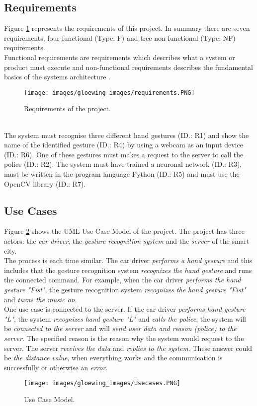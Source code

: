 \subsection{Requirements}
\label{subsec:requirements}
Figure \ref{fig:requirements} represents the requirements of this project. In summary there are seven requirements, four functional (Type: F) and tree non-functional (Type: NF) requirements.\\
Functional requirements are requirements which describes what a system or product must execute \cite{robertson2012mastering} and non-functional requirements describes the fundamental basics of the systems architecture \cite{6365165}.
\begin{figure}
\sidecaption
\texttt{[image: images/gloewing\_images/requirements.PNG]}
\caption{Requirements of the project.}
\label{fig:requirements}
\end{figure}\\
The system must recognise three different hand gestures (ID.: R1) and show the name of the identified gesture (ID.: R4) by using a webcam as an input device (ID.: R6). One of these gestures must makes a request to the server to call the police (ID.: R2). The system must have trained a neuronal network (ID.: R3), must be written in the program language Python (ID.: R5) and must use the OpenCV library (ID.: R7).


\subsection{Use Cases}
\label{subsec:usecases}
Figure \ref{fig:usecase} shows the UML Use Case Model of the project. The project has three actors: the \textit{car driver}, the \textit{gesture recognition system} and the \textit{server} of the smart city.\\
The process is each time similar. The car driver \textit{performs a hand gesture} and this includes that the gesture recognition system \textit{recognizes the hand gesture} and runs the connected command. For example, when the car driver \textit{performs the hand gesture "Fist"}, the gesture recognition system \textit{recognizes the hand gesture "Fist"} and \textit{turns the music on}.\\
One use case is connected to the server. If the car driver \textit{performs hand gesture "L"}, the system \textit{recognizes hand gesture "L"} and \textit{calls the police}, the system will be \textit{connected to the server} and will \textit{send user data and reason (police) to the server}. The specified reason is the reason why the system would request to the server. The server \textit{receives the data} and \textit{replies to the system}. These answer could be \textit{the distance value}, when everything works and the communication is successfully or otherwise an \textit{error}.
\begin{figure}
\sidecaption
\texttt{[image: images/gloewing\_images/Usecases.PNG]}
\caption{Use Case Model.}
\label{fig:usecase}
\end{figure}


